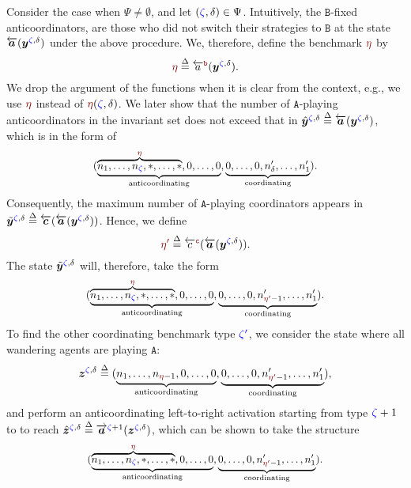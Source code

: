 \documentclass[10 pt,twocolumn,journal]{IEEEtran}
\theoremstyle{plain}
\newcommand{\db}{\overset{\Delta}{=}}
\newcommand{\A}{\mathcal{A}}
\newcommand{\y}{\bm{y}}
\newcommand{\z}{\bm{z}}
\renewcommand{\a}{\bm{a}}
\renewcommand{\c}{\bm{c}}
\renewcommand{\r}{\tb{\zeta}}
\newcommand{\rr}{\tb{\zeta'}}
\newcommand{\s}{\tr{\eta}}
\renewcommand{\ss}{\tr{\eta'}}
\renewcommand{\d}{{\delta}}
\renewcommand{\o}{\tr{\mathtt{b}}}
\newcommand{\oo}{\tr{\mathtt{c}}}
\renewcommand{\A}{\mathtt{A}}
\newcommand{\B}{\mathtt{B}}
\newcommand{\tb}{\textcolor{blue}}
\newcommand{\tr}{\textcolor{Myred}}
\theoremstyle{definition}
\begin{document}
Consider the case when $\Psi\neq \emptyset$, and let $(\r,\d)\in \Psi$.
Intuitively, the $\B$-fixed anticoordinators, are those who did not switch their strategies to $\B$ at the state $\overleftarrow{\a}(\y^{\r,\d})$ under the above procedure.
We, therefore, define the benchmark $\s$ by
\begin{equation}
    \s \db 
    \overleftarrow{a}^{\o}(\y^{\r,\d}). \label{th1_def2}
\end{equation}
We drop the argument of the functions when it is clear from the context, e.g., we use $\s$ instead of $\s(\r,\d)$.
We later show that the number of $\A$-playing anticoordinators in the invariant set does not exceed that in $\hat{\y}^{\r,\d} \db \overleftarrow{\a}(\y^{\r,\d})$, which is in the form of
\begin{equation*}\scalebox{.96}{\text{$
    (\underbrace{\overbrace{n_1,\ldots,n_{\r},*,\ldots,*}^{\s}, 0,\ldots,0}_{\text{anticoordinating}}, 
    \underbrace{0,\ldots,0, n'_{\d}, \ldots, n'_{1}}_{\text{coordinating}})$}}.
\end{equation*}
Consequently, the maximum number of $\A$-playing coordinators appears in $\tilde{\y}^{\r,\d} \db \overleftarrow{\c}(\overleftarrow{\a}(\y^{\r,\d}))$. 
Hence, we define
\begin{equation}
    \ss \db 
    \overleftarrow{c}^{\oo}(\overleftarrow{\a}(\y^{\r,\d})). \label{th1_def3}
\end{equation}
The state $\tilde{\y}^{\r,\d}$ will, therefore, take the form
\begin{equation*}\scalebox{.96}{\text{$
    (\underbrace{\overbrace{n_1,\ldots,n_{\r},*,\ldots,*}^{\s}, 0,\ldots,0}_{\text{anticoordinating}}, 
    \underbrace{0,\ldots,0, n'_{\ss-1}, \ldots, n'_{1}}_{\text{coordinating}})$}}.
\end{equation*}
To find the other coordinating benchmark type $\rr$, we consider the state where all wandering agents are playing $\A$:
\begin{equation*}
\z^{\r,\d} \db 
    (\underbrace{n_1,\ldots,n_{\s-1},0,\ldots,0}_{\text{anticoordinating}}, 
    \underbrace{0,\ldots,0, n'_{\ss-1}, \ldots, n'_{1}}_{\text{coordinating}}),
\end{equation*}
and perform an anticoordinating left-to-right activation starting from type $\r+1$ to
to reach $\hat{\z}^{\r,\d} \db \overrightarrow{\a}^{\r+1}(\z^{\r,\delta})$, which can be shown to take the structure
\begin{equation*}\scalebox{.95}{\text{$
    (\underbrace{\overbrace{n_1,\ldots,n_{\r},*,\ldots,*}^{\s},
    0,\ldots,0}_{\text{anticoordinating}}, 
    \underbrace{0,\ldots,0, n'_{\ss-1}, \ldots, n'_{1}}_{\text{coordinating}})$}}.
\end{equation*}
\end{document}
